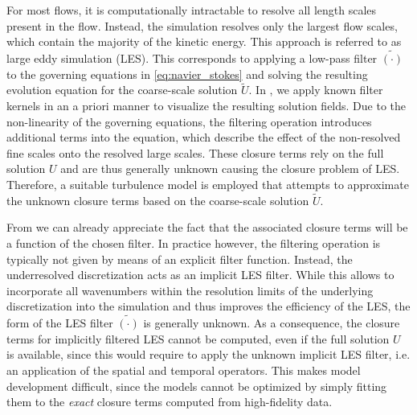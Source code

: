 For most flows, it is computationally intractable to resolve all length scales present in the flow.
Instead, the simulation resolves only the largest flow scales, which contain the majority of the kinetic energy.
This approach is referred to as large eddy simulation (LES).
This corresponds to applying a low-pass filter $\tilde{(\cdot)}$ to the governing equations in \eqref{eq:navier_stokes} and solving the resulting evolution equation for the coarse-scale solution $\tilde{U}$.
In , we apply known filter kernels in an a priori manner to visualize the resulting solution fields.
Due to the non-linearity of the governing equations, the filtering operation introduces additional terms into the equation, which describe the effect of the non-resolved fine scales onto the resolved large scales.
These closure terms rely on the full solution $U$ and are thus generally unknown causing the closure problem of LES.
Therefore, a suitable turbulence model is employed that attempts to approximate the unknown closure terms based on the coarse-scale solution $\tilde{U}$.

From  we can already appreciate the fact that the associated closure terms will be a function of the chosen filter.
In practice however, the filtering operation is typically not given by means of an explicit filter function.
Instead, the underresolved discretization acts as an implicit LES filter.
While this allows to incorporate all wavenumbers within the resolution limits of the underlying discretization into the simulation and thus improves the efficiency of the LES, the form of the LES filter $\tilde{(\cdot)}$ is generally unknown.
As a consequence, the closure terms for implicitly filtered LES cannot be computed, even if the full solution $U$ is available, since this would require to apply the unknown implicit LES filter, i.e. an application of the spatial and temporal operators.
This makes model development difficult, since the models cannot be optimized by simply fitting them to the \textit{exact} closure terms computed from high-fidelity data.

